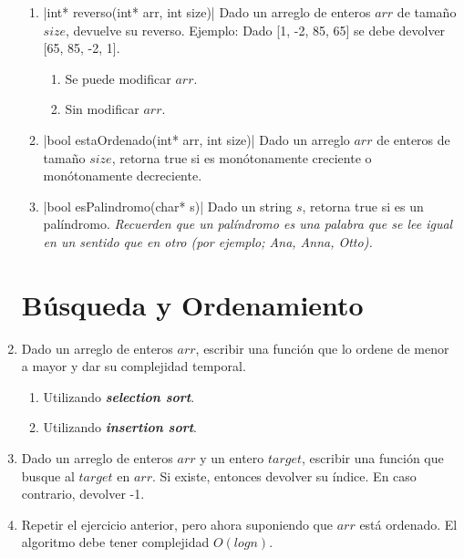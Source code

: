 \documentclass[titlepage,oneside]{book}
\begin{document}
\begin{enumerate}
\begin{enumerate}
        \item{}|int* reverso(int* arr, int size)|
        Dado un arreglo de enteros $arr$ de tamaño $size$, devuelve su reverso. \newline
        Ejemplo: Dado [1, -2, 85, 65] se debe devolver [65, 85, -2, 1].
        \begin{enumerate}
            \item Se puede modificar $arr$.
            \item Sin modificar $arr$.
        \end{enumerate}

        \item{}|bool estaOrdenado(int* arr, int size)|
        Dado un arreglo $arr$ de enteros de tamaño $size$, retorna true si es monótonamente creciente o monótonamente decreciente.

        \item{}|bool esPalindromo(char* s)|
        Dado un string $s$, retorna true si es un palíndromo. \textit{Recuerden que un palíndromo es una palabra que se lee igual en un sentido que en otro (por ejemplo; Ana, Anna, Otto).}
    \end{enumerate}

    \section{Búsqueda y Ordenamiento}

    \item Dado un arreglo de enteros $arr$, escribir una función que lo ordene de menor a mayor y dar su complejidad temporal.
    \begin{enumerate}
     \item Utilizando \textbf{\textit{selection sort}}.
     \item Utilizando \textbf{\textit{insertion sort}}. 
    \end{enumerate}

    \item Dado un arreglo de enteros $arr$  y un entero $target$,
    escribir una función que busque al $target$ en $arr$. Si existe, entonces devolver su índice. En caso contrario, devolver -1.

    \item Repetir el ejercicio anterior, pero ahora suponiendo que $arr$ está ordenado. El algoritmo debe tener complejidad $O(log{}n)$.
    
\end{enumerate}
\end{document}
